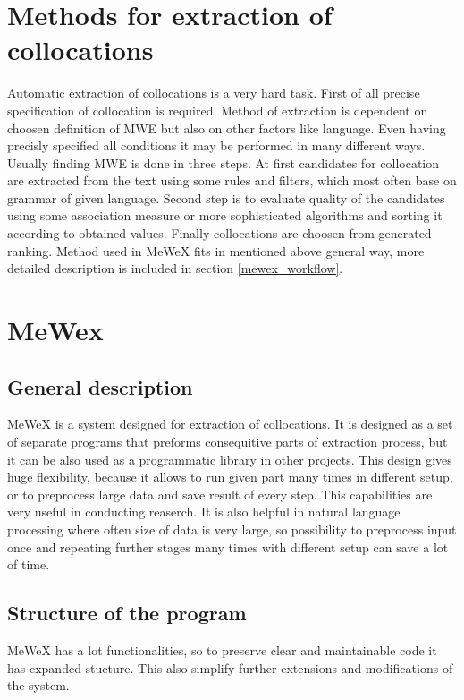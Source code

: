\section{Methods for extraction of collocations}
Automatic extraction of collocations is a very hard task. First of all precise specification of collocation is required.
Method of extraction is dependent on choosen definition of MWE but also on other factors like language. 
Even having precisly specified all conditions it may be performed in many different ways. 
Usually finding MWE is done in three steps. At first candidates for collocation are extracted from the text using some rules and filters, 
which most often base on grammar of given language. Second step is to evaluate quality of the candidates 
using some association measure or more sophisticated algorithms and sorting it according to obtained values. 
Finally collocations are choosen from generated ranking. Method used in MeWeX fits in mentioned above general way, 
more detailed description is included in section \ref{mewex_workflow}.

\section{MeWex}

\subsection{General description}
MeWeX is a system designed for extraction of collocations. It is designed as a set of separate programs 
that preforms consequitive parts of extraction process, but it can be also used as a programmatic library in other projects. 
This design gives huge flexibility, because it allows to run given part many times in different setup, 
or to preprocess large data and save result of every step. This capabilities are very useful in conducting reaserch. 
It is also helpful in natural language processing where often size of data is very large, so possibility 
to preprocess input once and repeating further stages many times with different setup can save a lot of time.

\subsection{Structure of the program}
MeWeX has a lot functionalities, so to preserve clear and maintainable code it has expanded stucture. 
This also simplify further extensions and modifications of the system.

